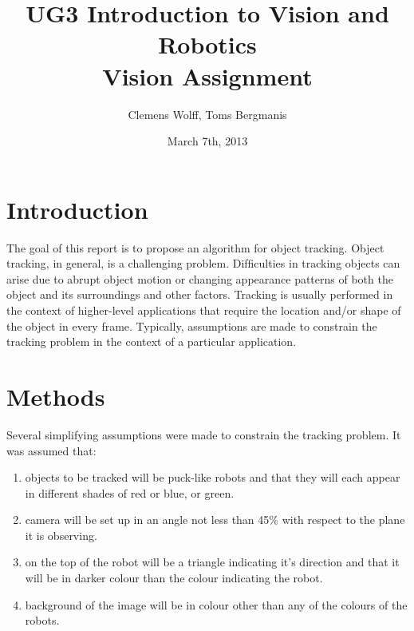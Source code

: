 \documentclass[10pt,a4paper]{article}
\title{UG3 Introduction to Vision and Robotics \\ Vision Assignment}
\author{Clemens Wolff, Toms Bergmanis}
\date{March 7th, 2013}
\begin{document}
\maketitle

\section{Introduction}\label{intro}
The goal of this report is to propose an algorithm for object tracking. 
Object tracking, in general, is a challenging problem. Difﬁculties in tracking 
objects can arise due to abrupt object motion or changing appearance patterns
 of both the object and its surroundings and other factors. Tracking is 
usually performed in the context of higher-level applications that require 
the location and/or shape of the object in every frame. Typically, assumptions
 are made to constrain the tracking problem 
in the context of a particular application\cite{REF}.


\section{Methods}\label{methods}

Several simplifying assumptions were made to constrain the tracking problem.
It was assumed that:
\begin{enumerate}
\item objects to be tracked will be puck-like robots and that they will 
each appear in different shades of red or blue, or green.
\item camera will be set up in an angle not less than 45\% with respect to the 
plane it is observing. 
\item on the top of the robot will be a triangle indicating it's direction and 
that it will be in darker colour than the colour indicating the robot.  
\item background of the image will be in colour other than any of the
 colours of the robots.
\end{enumerate}
\end{document}
